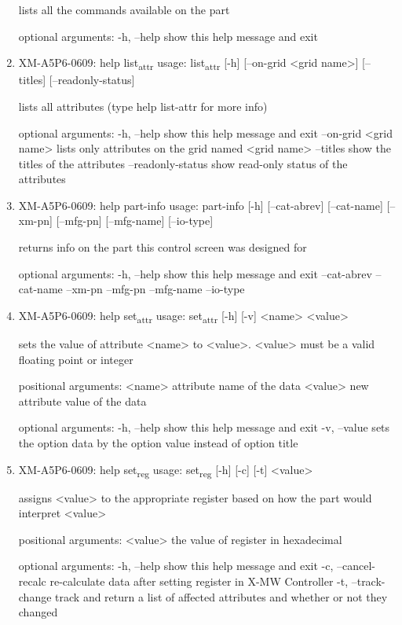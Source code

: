 \documentclass[11pt]{article}
\begin{document}
\begin{enumerate}
lists all the commands available on the part

optional arguments:
  -h, --help  show this help message and exit

\item XM-A5P6-0609: help list\textsubscript{attr}
\label{sec:org1ececa4}
usage: list\textsubscript{attr} [-h] [--on-grid <grid name>] [--titles] [--readonly-status]

lists all attributes (type help list-attr for more info)

optional arguments:
  -h, --help            show this help message and exit
  --on-grid <grid name>
                        lists only attributes on the grid named <grid name>
  --titles              show the titles of the attributes
  --readonly-status     show read-only status of the attributes

\item XM-A5P6-0609: help part-info
\label{sec:org32c6794}
usage: part-info  [-h] [--cat-abrev] [--cat-name] [--xm-pn] [--mfg-pn] [--mfg-name]
        [--io-type]

returns info on the part this control screen was designed for

optional arguments:
  -h, --help   show this help message and exit
  --cat-abrev
  --cat-name
  --xm-pn
  --mfg-pn
  --mfg-name
  --io-type

\item XM-A5P6-0609: help set\textsubscript{attr}
\label{sec:org7ee2877}
usage: set\textsubscript{attr} [-h] [-v] <name> <value>

sets the value of attribute <name> to <value>. <value> must be a valid
floating point or integer

positional arguments:
  <name>       attribute name of the data
  <value>      new attribute value of the data

optional arguments:
  -h, --help   show this help message and exit
  -v, --value  sets the option data by the option value instead of option
               title

\item XM-A5P6-0609: help set\textsubscript{reg}
\label{sec:org2078e79}
usage: set\textsubscript{reg} [-h] [-c] [-t] <value>

assigns <value> to the appropriate register based on how the part would
interpret <value>

positional arguments:
  <value>              the value of register in hexadecimal

optional arguments:
  -h, --help           show this help message and exit
  -c, --cancel-recalc  re-calculate data after setting register in X-MW
                       Controller
  -t, --track-change   track and return a list of affected attributes and
                       whether or not they changed


\end{enumerate}
\end{document}

